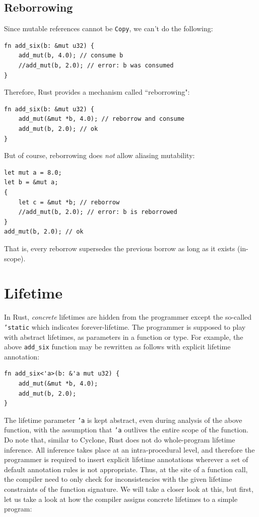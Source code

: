 \documentclass[11pt]{report}
\begin{document}
\subsection*{Reborrowing}

Since mutable references cannot be \texttt{Copy}, we can't do the following:

\begin{lstlisting}
fn add_six(b: &mut u32) {
    add_mut(b, 4.0); // consume b
    //add_mut(b, 2.0); // error: b was consumed
}
\end{lstlisting}

\noindent Therefore, Rust provides a mechanism called ``reborrowing":

\begin{lstlisting}
fn add_six(b: &mut u32) {
    add_mut(&mut *b, 4.0); // reborrow and consume
    add_mut(b, 2.0); // ok
}
\end{lstlisting}

\noindent But of course, reborrowing does \textit{not} allow aliasing mutability:

\begin{lstlisting}
let mut a = 8.0;
let b = &mut a;
{
    let c = &mut *b; // reborrow
    //add_mut(b, 2.0); // error: b is reborrowed
}
add_mut(b, 2.0); // ok
\end{lstlisting}

\noindent That is, every reborrow supersedes the previous borrow as long as it exists (in-scope).

\section*{Lifetime}

In Rust, \textit{concrete} lifetimes are hidden from the programmer except the so-called \texttt{'static} which indicates forever-lifetime. The programmer is supposed to play with abstract lifetimes, as parameters in a function or type. For example, the above \texttt{add\_six} function may be rewritten as follows with explicit lifetime annotation:

\begin{lstlisting}
fn add_six<'a>(b: &'a mut u32) {
    add_mut(&mut *b, 4.0);
    add_mut(b, 2.0);
}
\end{lstlisting}

The lifetime parameter \texttt{'a} is kept abstract, even during analysis of the above function, with the assumption that \texttt{'a} outlives the entire scope of the function. Do note that, similar to Cyclone, Rust does not do whole-program lifetime inference. All inference takes place at an intra-procedural level, and therefore the programmer is required to insert explicit lifetime annotations wherever a set of default annotation rules is not appropriate. Thus, at the site of a function call, the compiler need to only check for inconsistencies with the given lifetime constraints of the function signature. We will take a closer look at this, but first, let us take a look at how the compiler assigns concrete lifetimes to a simple program:
\end{document}
